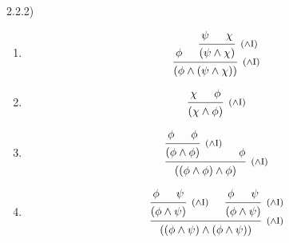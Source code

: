 \documentclass{article}
\theoremstyle{definition}
\newcommand{\ci}{\footnotesize (\(\wedge\)I)}
\begin{document}
2.2.2)
\begin{enumerate}
  \item
  \[
    \begin{prooftree}
      \hypo{\phi}
      \hypo{\psi}
      \hypo{\chi}
      \infer2[\ci]{(\psi\land\chi)}
      \infer2[\ci]{(\phi \land (\psi\land\chi))}
    \end{prooftree}
  \]
  \item
  \[
    \begin{prooftree}
      \hypo{\chi}
      \hypo{\phi}
      \infer2[\ci]{(\chi\land\phi)}
    \end{prooftree}
  \]

  \item
  \[
    \begin{prooftree}
      \hypo{\phi}
      \hypo{\phi}
      \infer2[\ci]{(\phi\land\phi)}
      \hypo{\phi}
      \infer2[\ci]{((\phi\land\phi)\land \phi)}
    \end{prooftree}
  \]
  \item
  \[
    \begin{prooftree}
      \hypo{\phi}
      \hypo{\psi}
      \infer2[\ci]{(\phi\land\psi)}
      \hypo{\phi}
      \hypo{\psi}
      \infer2[\ci]{(\phi\land\psi)}
      \infer2[\ci]{((\phi\land\psi)\land(\phi\land\psi))}
    \end{prooftree}
  \]

\end{enumerate}
\end{document}
